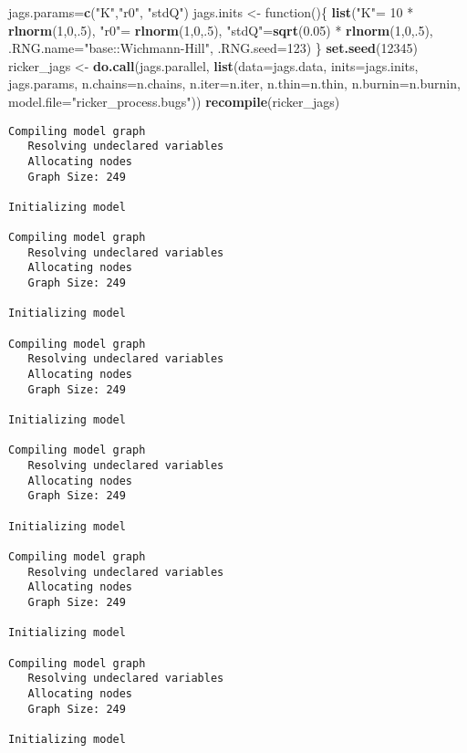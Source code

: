 \documentclass[author-year, review]{elsarticle} %
\newenvironment{Shaded}{}{}
\newcommand{\KeywordTok}[1]{\textcolor[rgb]{0.00,0.44,0.13}{\textbf{{#1}}}}
\newcommand{\DataTypeTok}[1]{\textcolor[rgb]{0.56,0.13,0.00}{{#1}}}
\newcommand{\DecValTok}[1]{\textcolor[rgb]{0.25,0.63,0.44}{{#1}}}
\newcommand{\FloatTok}[1]{\textcolor[rgb]{0.25,0.63,0.44}{{#1}}}
\newcommand{\StringTok}[1]{\textcolor[rgb]{0.25,0.44,0.63}{{#1}}}
\newcommand{\NormalTok}[1]{{#1}}
\begin{document}
\begin{Shaded}
\begin{Highlighting}[]
\NormalTok{jags.params=}\KeywordTok{c}\NormalTok{(}\StringTok{"K"}\NormalTok{,}\StringTok{"r0"}\NormalTok{, }\StringTok{"stdQ"}\NormalTok{)}
\NormalTok{jags.inits <- function()\{}
  \KeywordTok{list}\NormalTok{(}\StringTok{"K"}\NormalTok{= }\DecValTok{10} \NormalTok{* }\KeywordTok{rlnorm}\NormalTok{(}\DecValTok{1}\NormalTok{,}\DecValTok{0}\NormalTok{,.}\DecValTok{5}\NormalTok{),}
       \StringTok{"r0"}\NormalTok{= }\KeywordTok{rlnorm}\NormalTok{(}\DecValTok{1}\NormalTok{,}\DecValTok{0}\NormalTok{,.}\DecValTok{5}\NormalTok{),}
       \StringTok{"stdQ"}\NormalTok{=}\KeywordTok{sqrt}\NormalTok{(}\FloatTok{0.05}\NormalTok{) * }\KeywordTok{rlnorm}\NormalTok{(}\DecValTok{1}\NormalTok{,}\DecValTok{0}\NormalTok{,.}\DecValTok{5}\NormalTok{),}
       \DataTypeTok{.RNG.name=}\StringTok{"base::Wichmann-Hill"}\NormalTok{, }\DataTypeTok{.RNG.seed=}\DecValTok{123}\NormalTok{)}
\NormalTok{\}}
\KeywordTok{set.seed}\NormalTok{(}\DecValTok{12345}\NormalTok{) }
\NormalTok{ricker_jags <- }\KeywordTok{do.call}\NormalTok{(jags.parallel, }
                       \KeywordTok{list}\NormalTok{(}\DataTypeTok{data=}\NormalTok{jags.data, }\DataTypeTok{inits=}\NormalTok{jags.inits, }
                            \NormalTok{jags.params, }\DataTypeTok{n.chains=}\NormalTok{n.chains, }
                            \DataTypeTok{n.iter=}\NormalTok{n.iter, }\DataTypeTok{n.thin=}\NormalTok{n.thin, }\DataTypeTok{n.burnin=}\NormalTok{n.burnin,}
                            \DataTypeTok{model.file=}\StringTok{"ricker_process.bugs"}\NormalTok{))}
\KeywordTok{recompile}\NormalTok{(ricker_jags)}
\end{Highlighting}
\end{Shaded}

\begin{verbatim}
Compiling model graph
   Resolving undeclared variables
   Allocating nodes
   Graph Size: 249

Initializing model

Compiling model graph
   Resolving undeclared variables
   Allocating nodes
   Graph Size: 249

Initializing model

Compiling model graph
   Resolving undeclared variables
   Allocating nodes
   Graph Size: 249

Initializing model

Compiling model graph
   Resolving undeclared variables
   Allocating nodes
   Graph Size: 249

Initializing model

Compiling model graph
   Resolving undeclared variables
   Allocating nodes
   Graph Size: 249

Initializing model

Compiling model graph
   Resolving undeclared variables
   Allocating nodes
   Graph Size: 249

Initializing model
\end{verbatim}
\end{document}
